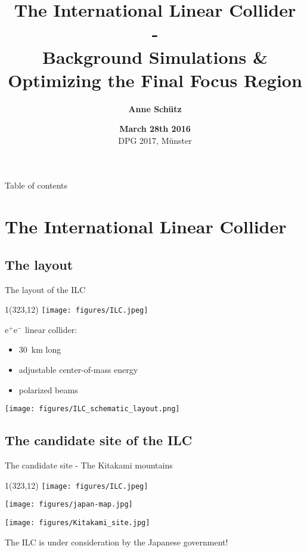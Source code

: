 \documentclass[xcolor={dvipsnames}]{beamer}
\title[ILC \& Background Simulations]{\textbf{\LARGE The International Linear Collider \\ \normalsize- \\ \small Background Simulations \& Optimizing the Final Focus Region}}
\author{\textbf{Anne Sch\"utz}}
\institute{\textbf{KIT, DESY}}
\date[March 28th 2016]{\textbf{March 28th 2016}\\DPG 2017, M\"unster}
\newcommand{\ilclogo}{
  \setlength{\TPHorizModule}{1pt}
  \setlength{\TPVertModule}{1pt}
  \begin{textblock}{1}(323,12)
   \texttt{[image: figures/ILC.jpeg]}
  \end{textblock}
}
\begin{document}
{
\begin{frame}
  \titlepage
\end{frame}
}

\begin{frame}{Table of contents}
  \tableofcontents
\end{frame}

\section{The International Linear Collider}
\subsection{The layout}
\begin{frame}{The layout of the ILC}
\ilclogo
e$^+$e$^-$ linear collider:
\begin{itemize}
 \item \SI{30}{\kilo\metre} long
 \item adjustable center-of-mass energy
 \item polarized beams
\end{itemize}
\begin{center}
\texttt{[image: figures/ILC\_schematic\_layout.png]}
\end{center}
\end{frame}

\subsection{The candidate site of the ILC}

\begin{frame}{The candidate site - The Kitakami mountains}
\ilclogo
\begin{center}
\begin{minipage}[t]{0.49\textwidth}
\centering
 \texttt{[image: figures/japan-map.jpg]}
\end{minipage}
\begin{minipage}[t]{0.48\textwidth}
\centering
   \texttt{[image: figures/Kitakami\_site.jpg]}
\end{minipage}
\begin{block}{}
 The ILC is under consideration by the Japanese government!
\end{block}

\end{center}
\end{frame}
\end{document}

